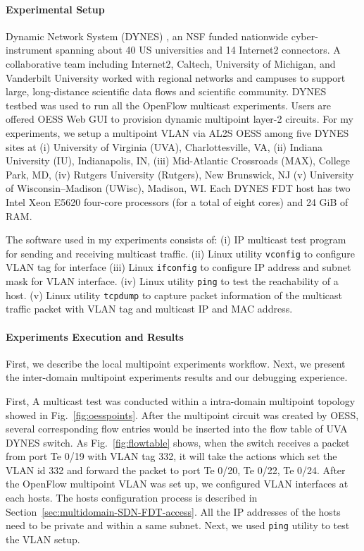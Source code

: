 \paragraph{Experimental Setup}
Dynamic Network System (DYNES) \cite{1742-6596-396-4-042065}, an NSF funded nationwide cyber-instrument spanning about 40 US universities and 14 Internet2 connectors. A collaborative team including Internet2, Caltech, University of Michigan, and Vanderbilt University worked with regional networks and campuses to support large, long-distance scientific data flows and scientific community. DYNES testbed was used to run all the OpenFlow multicast experiments. Users are offered OESS Web GUI to provision dynamic multipoint layer-2 circuits. For my experiments, we setup a multipoint VLAN via AL2S OESS among five DYNES sites at (i) University of Virginia (UVA), Charlottesville, VA, (ii) Indiana University (IU), Indianapolis, IN, (iii) Mid-Atlantic Crossroads (MAX), College Park, MD, (iv) Rutgers University (Rutgers), New Brunswick, NJ (v) University of Wisconsin–Madison (UWisc), Madison, WI. Each DYNES FDT host has two Intel Xeon
E5620 four-core processors (for a total of eight cores) and
24 GiB of RAM.

The software used in my experiments consists of: (i) IP multicast test program for sending and receiving multicast traffic.  (ii) Linux utility \texttt{vconfig} to configure VLAN tag for interface  (iii) Linux \texttt{ifconfig} to configure IP address and subnet mask for VLAN interface. (iv) Linux utility \texttt{ping} to test the reachability of a host. (v) Linux utility \texttt{tcpdump} to capture packet information of the multicast traffic packet with VLAN tag and multicast IP and MAC address.

\paragraph{Experiments Execution and Results}
First, we describe the local multipoint experiments workflow. Next, we present the inter-domain multipoint experiments results and our debugging experience.


First, A multicast test was conducted within a intra-domain multipoint topology showed in Fig.~\ref{fig:oesspoints}. After the multipoint circuit was created by OESS, several corresponding flow entries would be inserted into the flow table of UVA DYNES switch. As Fig.~\ref{fig:flowtable} shows, when the switch receives a packet from port Te 0/19 with VLAN tag 332, it will take the actions which set the VLAN id 332 and forward the packet to port Te 0/20, Te 0/22, Te 0/24. After the OpenFlow multipoint VLAN was set up, we configured VLAN interfaces at each hosts. The hosts configuration process is described in Section~\ref{sec:multidomain-SDN-FDT-access}. All the IP addresses of the hosts need to be private and within a same subnet. Next, we used \texttt{ping} utility to test the VLAN setup.

